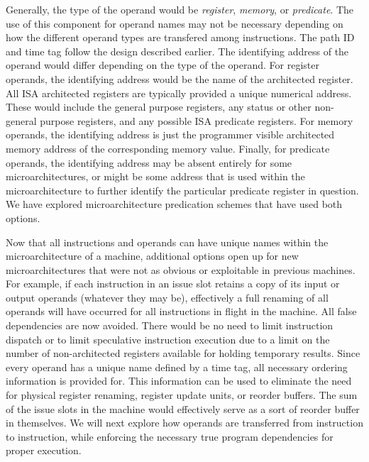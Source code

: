 \documentclass[10pt,twocolumn]{article}
\begin{document}
Generally, the type of the operand would be \textit{register},
\textit{memory}, or \textit{predicate}.
The use of this component for operand names may not be
necessary depending on how the different operand types
are transfered among instructions.
The path ID and time tag follow the design described
earlier.
The identifying address of the operand would differ
depending on the type of the operand.
For register operands, the identifying address would be
the name of the architected register.
All ISA architected registers are typically provided a
unique numerical address.  These would include the
general purpose registers, any status or other non-general
purpose registers, and any possible ISA predicate registers.
For memory operands, the identifying address is just the
programmer visible architected memory address of the corresponding
memory value.
Finally, for predicate operands, the identifying address
may be absent entirely for some microarchitectures, or
might be some address that is used within the microarchitecture
to further identify the particular predicate register in question.
We have explored microarchitecture predication schemes that 
have used both options.

Now that all instructions and operands can have
unique names within the microarchitecture of a machine,
additional options open up for new microarchitectures
that were not as obvious or exploitable in previous
machines.
For example, if each instruction in an issue slot
retains a copy of its input or output operands (whatever
they may be), effectively a full renaming of
all operands will have occurred for all instructions
in flight in the machine.  
All false dependencies are now avoided.
There would be no need to limit instruction dispatch or to limit speculative
instruction execution due to a limit on the number of non-architected
registers available for holding temporary results.
Since every operand has a unique name defined by a time tag, 
all necessary ordering information is provided for.
This information can be used 
to eliminate the need for physical register renaming,
register update units, or reorder buffers.
The sum of the issue slots in the machine would effectively serve
as a sort of reorder buffer in themselves.
We will next
explore how operands are transferred from
instruction to instruction, while enforcing the necessary
true program dependencies for proper execution.
%
%
\vspace{-0.25in}
\end{document}

